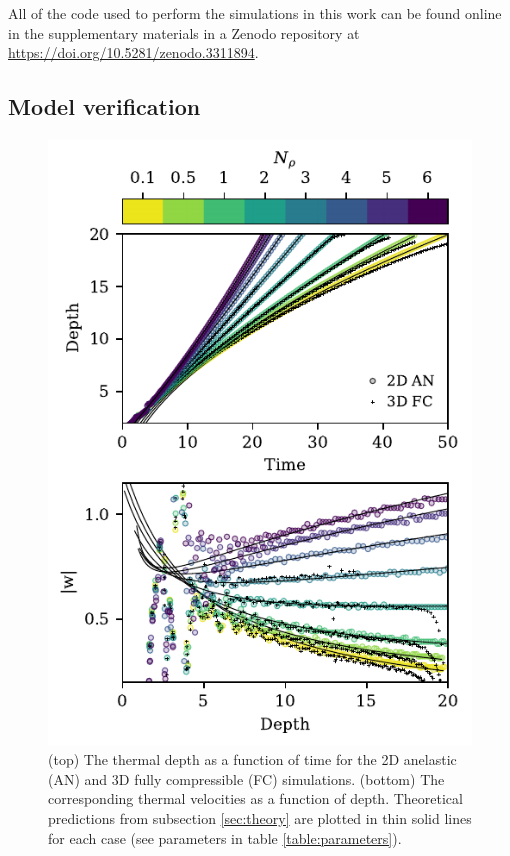All of the code used to perform the simulations in this work can be found online in the supplementary materials in a Zenodo repository \cite{supp_andersetall2019b} at \url{https://doi.org/10.5281/zenodo.3311894}.


\subsection{Model verification}
\label{sec:results}
\begin{figure}[p!]
    \includegraphics[width=\columnwidth]{./figs/results_panels.pdf}
    \caption[Depth and radius evolution of thermals at varying stratifications.]
	{
	(top) The thermal depth as a function of time for the 2D anelastic (AN) and 3D fully compressible (FC) simulations.
	(bottom) The corresponding thermal velocities as a function of depth.
	Theoretical predictions from subsection \ref{sec:theory} are plotted in thin solid lines for each case (see parameters in table \ref{table:parameters}).
    \label{fig:results_panels} }
\end{figure}

